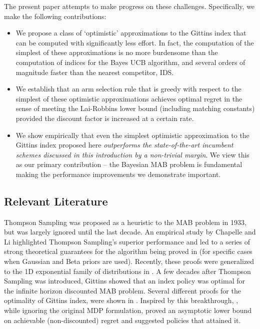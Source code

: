 The present paper attempts to make progress on these challenges. Specifically, we make the following contributions:
\begin{itemize}
	\item We propose a class of `optimistic' approximations to the Gittins index that can be computed with significantly less effort. In fact, the computation of the simplest of these approximations is no more burdensome than the computation of indices for the Bayes UCB algorithm, and several orders of magnitude faster than the nearest competitor, IDS. 
	\item We establish that an arm selection rule that is greedy with respect to the simplest of these optimistic approximations achieves optimal regret in the sense of meeting the Lai-Robbins lower bound (including matching constants) provided the discount factor is increased at a certain rate.
	\item We show empirically that even the simplest optimistic approximation to the Gittins index proposed here {\em outperforms the state-of-the-art incumbent schemes discussed in this introduction by a non-trivial margin}. We view this as our primary contribution -- the Bayesian MAB problem is fundamental making the performance improvements we demonstrate important.  
\end{itemize}

\subsection{Relevant Literature}
Thompson Sampling \cite{thompson1933likelihood} was proposed as a heuristic to the MAB problem in 1933, but was largely ignored until the last decade. An empirical study by Chapelle and Li \cite{chapelle2011empirical} highlighted Thompson Sampling's superior performance and led to a series of strong theoretical guarantees for the algorithm being proved in \cite{agrawalanalysis,agrawal2013further,kaufmann2012thompson} (for specific cases when Gaussian and Beta priors are used). Recently, these proofs were generalized to the 1D exponential family of distributions in \cite{korda2013thompson}. A few decades after Thompson Sampling was introduced, Gittins \cite{gittins1979bandit} showed that an index policy was optimal for the infinite horizon discounted MAB problem. Several different proofs for the optimality of Gittins index, were shown in \cite{tsitsiklis1994short,weber1992gittins,whittle1980multi,bertsimas1996conservation}. Inspired by this breakthrough, \cite{lai1985asymptotically,lai1987adaptive}, while ignoring the original MDP formulation, proved an asymptotic lower bound on achievable (non-discounted) regret and suggested policies that attained it.

